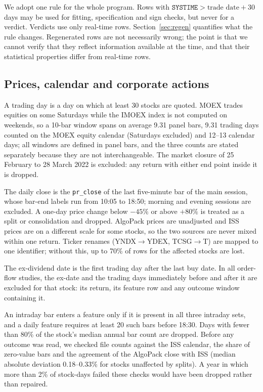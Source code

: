 We adopt one rule for the whole program. Rows with $\texttt{SYSTIME} > \text{trade date} + 30$ days may be used for fitting, specification and sign checks, but never for a verdict. Verdicts use only real-time rows. Section~\ref{sec:regen} quantifies what the rule changes. Regenerated rows are not necessarily wrong; the point is that we cannot verify that they reflect information available at the time, and that their statistical properties differ from real-time rows.

\subsection{Prices, calendar and corporate actions}

A trading day is a day on which at least 30 stocks are quoted. MOEX trades equities on some Saturdays while the IMOEX index is not computed on weekends, so a 10-bar window spans on average 9.31 panel bars, 9.31 trading days counted on the MOEX equity calendar (Saturdays excluded) and 12--13 calendar days; all windows are defined in panel bars, and the three counts are stated separately because they are not interchangeable. The market closure of 25 February to 28 March 2022 is excluded: any return with either end point inside it is dropped.

The daily close is the \texttt{pr\_close} of the last five-minute bar of the main session, whose bar-end labels run from 10:05 to 18:50; morning and evening sessions are excluded. A one-day price change below $-45\%$ or above $+80\%$ is treated as a split or consolidation and dropped. AlgoPack prices are unadjusted and ISS prices are on a different scale for some stocks, so the two sources are never mixed within one return. Ticker renames (YNDX$\to$YDEX, TCSG$\to$T) are mapped to one identifier; without this, up to 70\% of rows for the affected stocks are lost.

The ex-dividend date is the first trading day after the last buy date. In all order-flow studies, the ex-date and the trading days immediately before and after it are excluded for that stock: its return, its feature row and any outcome window containing it.

An intraday bar enters a feature only if it is present in all three intraday sets, and a daily feature requires at least 20 such bars before 18:30. Days with fewer than 80\% of the stock's median annual bar count are dropped. Before any outcome was read, we checked file counts against the ISS calendar, the share of zero-value bars and the agreement of the AlgoPack close with ISS (median absolute deviation 0.18--0.33\% for stocks unaffected by splits). A year in which more than 2\% of stock-days failed these checks would have been dropped rather than repaired.

